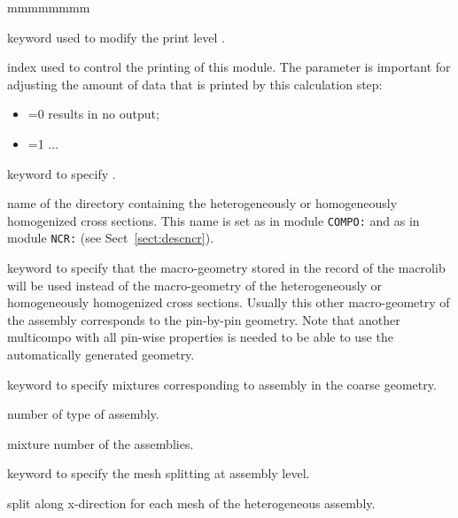 \begin{ListeDeDescription}{mmmmmmmm}

\item[\moc{EDIT}] keyword used to modify the print level .

\item[\dusa{iprint}] index used to control the printing of this module. The
 parameter is important for adjusting the amount of data that is
printed by this calculation step:

\begin{itemize}

\item {}=0 results in no output;

\item {}=1 ...

\end{itemize}

\item[\moc{DIRGEO}] keyword to specify . 

\item[\dusa{namedir}] name of the directory containing the heterogeneously or homogeneously homogenized cross sections. This name is set as    in module {\tt COMPO:} and as  in module {\tt NCR:} (see Sect~\ref{sect:descncr}).

\item[\moc{MACGEO}] keyword to specify that the macro-geometry stored in the  record of the macrolib will be used instead of the macro-geometry of the  heterogeneously or homogeneously homogenized cross sections. Usually this other macro-geometry of the assembly corresponds to the pin-by-pin geometry. Note that another multicompo with all pin-wise properties is needed to be able to use the automatically generated geometry. 

\item[\moc{MIXASS}] keyword to specify mixtures corresponding to assembly in the coarse geometry. 

\item[\dusa{nmix}] number of type of assembly. 

\item[\dusa{imix}] mixture number of the assemblies.

\item[\moc{SLPITX-ASS}] keyword to specify the mesh splitting at assembly level. 

\item[\dusa{ispx}] split along x-direction for each mesh of the heterogeneous assembly. 


\end{ListeDeDescription}

